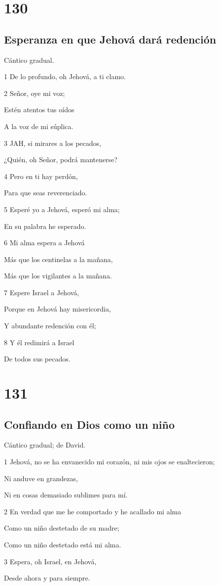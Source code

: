 \chapter{130}

\section*{Esperanza en que Jehová dará redención}

\par Cántico gradual.

\par 1 De lo profundo, oh Jehová, a ti clamo.
\par 2 Señor, oye mi voz;
\par Estén atentos tus oídos
\par A la voz de mi súplica.
\par 3 JAH, si mirares a los pecados,
\par ¿Quién, oh Señor, podrá mantenerse?
\par 4 Pero en ti hay perdón,
\par Para que seas reverenciado.
\par 5 Esperé yo a Jehová, esperó mi alma;
\par En su palabra he esperado.
\par 6 Mi alma espera a Jehová
\par Más que los centinelas a la mañana,
\par Más que los vigilantes a la mañana.
\par 7 Espere Israel a Jehová,
\par Porque en Jehová hay misericordia,
\par Y abundante redención con él;
\par 8 Y él redimirá a Israel
\par De todos sus pecados.

\chapter{131}

\section*{Confiando en Dios como un niño}

\par Cántico gradual; de David.

\par 1 Jehová, no se ha envanecido mi corazón, ni mis ojos se enaltecieron;
\par Ni anduve en grandezas,
\par Ni en cosas demasiado sublimes para mí.
\par 2 En verdad que me he comportado y he acallado mi alma
\par Como un niño destetado de su madre;
\par Como un niño destetado está mi alma.
\par 3 Espera, oh Israel, en Jehová,
\par Desde ahora y para siempre.

